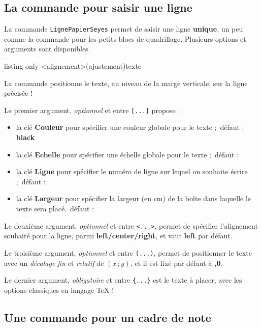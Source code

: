\documentclass[a4paper]{article}
\newcommand\Cle[1]{{\bfseries\sffamily\textlangle #1\textrangle}}
\begin{document}
\subsection{La commande pour saisir une ligne}

La commande \texttt{LignePapierSeyes} permet de saisir une ligne \textbf{unique}, un peu comme la commande pour les petits blocs de quadrillage. Plusieurs options et arguments sont disponibles.

\begin{PresentationCode}{listing only}
\LignePapierSeyes[options]<alignement>(ajustement){texte}
\end{PresentationCode}

La commande positionne le \textsf{texte}, au niveau de la marge verticale, sur la ligne précisée !

\smallskip

Le premier argument, \textit{optionnel} et entre \texttt{[...]} propose :

\begin{itemize}
	\item la clé \Cle{Couleur} pour spécifier une couleur globale pour le texte ;\hfill~défaut : \Cle{black}
	\item la clé \Cle{Echelle} pour spécifier une échelle globale pour le texte ;\hfill~défaut : \Cle{1}
	\item la clé \Cle{Ligne} pour spécifier le numéro de ligne sur lequel on souhaite écrire ;\hfill~défaut : \Cle{1}
	\item la clé \Cle{Largeur} pour spécifier la largeur (en cm) de la boîte dans laquelle le texte sera placé.\hfill~défaut : \Cle{16.8}
\end{itemize}

Le deuxième argument, \textit{optionnel} et entre \texttt{<...>}, permet de spécifier l'alignement souhaité pour la ligne, parmi \Cle{left/center/right}, et vaut \Cle{left} par défaut.

\smallskip

Le troisième argument, \textit{optionnel} et entre \texttt{(...)}, permet de positionner le texte avec un \textit{décalage fin} et \textit{relatif} de $(x\,;y)$, et il est fixé par défaut à \Cle{0,0}.

\smallskip

Le dernier argument, \textit{obligatoire} et entre \texttt{\{...\}} est le texte à placer, avec les options classiques en langage \TeX{} !

\subsection{Une commande pour un cadre de note}
\end{document}
